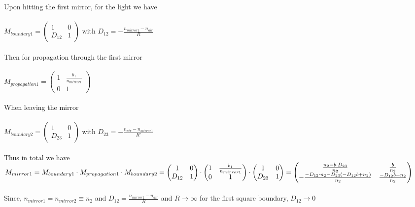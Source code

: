 \documentclass{article}
\begin{document}
Upon hitting the first mirror, for the light we have
\\\\
$M_{boundary 1}= \begin{pmatrix}
1 & 0\\
D_{12}& 1
\end{pmatrix}$ with $D_{12} = -\frac{n_{mirror 1}-n_{air}}{R}$
\\\\
Then for propagation through the first mirror
\\\\
$M_{propagation 1}= \begin{pmatrix}
1 & \frac{b_1}{n_{mirror 1}}\\
0 & 1
\end{pmatrix}$
\\\\
When leaving the mirror
\\\\
$M_{boundary 2}= \begin{pmatrix}
1 & 0\\
D_{23} & 1
\end{pmatrix}$ with $D_{23} = -\frac{n_{air}-n_{mirror 1}}{R'}$
\\\\
Thus in total we have
$M_{mirror 1}= M_{boundary 1} \cdot M_{propagation 1} \cdot M_{boundary 2} 
\\\\
= \begin{pmatrix}
1 & 0\\
D_{12} & 1
\end{pmatrix} \cdot \begin{pmatrix}
1 & \frac{b_1}{n_{mirror 1}}\\
0 & 1
\end{pmatrix} \cdot \begin{pmatrix}
1 & 0\\
D_{23} & 1
\end{pmatrix}= \begin{pmatrix}
\frac{n_2-b \cdot D_{23}}{n_2} & \frac{b}{n_2}\\
-\frac{-D_{12} \cdot n_2 - D_{23}(-D_{12}b+n_2)}{n_2} & \frac{-D_{12}b+n_2}{n_2}
\end{pmatrix}$
\\\\
Since, $n_{mirror1} = n_{mirror 2} \equiv n_2$ and $D_{12} = \frac{n_{mirror 1}-n_{air}}{R}$ and $R \xrightarrow[]{} \infty$ for the first square boundary, $D_{12} \xrightarrow[]{} 0$
\end{document}
